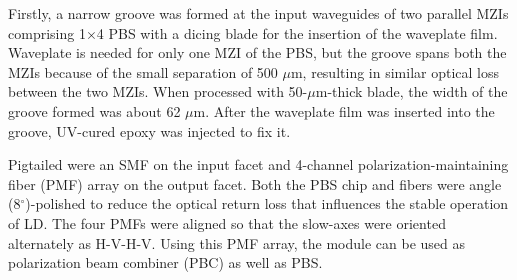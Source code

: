 \documentclass[letterpaper, 10pt]{article}
\begin{document}
Firstly, a narrow groove was formed at the input waveguides of two parallel MZIs comprising 1$\times$4 PBS with a dicing blade for the insertion of the waveplate film.
Waveplate is needed for only one MZI of the PBS, but the groove spans  both the MZIs because of the small separation of 500 $\mu$m, resulting in similar optical loss between the two MZIs.
When processed with 50-$\mu$m-thick blade, the width of the groove formed was about 62 $\mu$m.
After the waveplate film was inserted into the groove, UV-cured epoxy was injected to fix it.

Pigtailed were an SMF on the input facet and 4-channel polarization-maintaining fiber (PMF) array on the output facet.
Both the PBS chip and fibers were angle (8$^\circ$)-polished to reduce the optical return loss that influences the stable operation of LD.
The four PMFs were aligned so that the slow-axes  were oriented alternately as H-V-H-V.
Using this PMF array, the module can be used as polarization beam combiner (PBC) as well as PBS.
\end{document}
